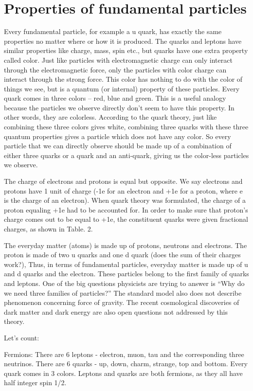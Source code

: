 \section{Properties of fundamental particles}
Every fundamental particle, for example a u quark, has exactly the same properties no matter where or how it is produced.   The quarks and leptons have similar properties like charge, mass, spin etc., but quarks have one extra property called color. Just like particles with electromagnetic charge can only interact through the electromagnetic force, only the particles with color charge can interact through the strong force. This color has nothing to do with the color of things we see, but is a quantum (or internal) property of these particles. Every quark comes in three colors – red, blue and green. This is a useful analogy because the particles we observe directly don’t seem to have this property. In other words, they are colorless. According to the quark theory, just like combining these three colors gives white, combining three quarks with these three quantum properties gives a particle which does not have any color. So every particle that we can directly observe should be made up of a combination of either three quarks or a quark and an anti-quark, giving us the color-less particles we observe. 

The charge of electrons and protons is equal but opposite. We say electrons and protons have 1 unit of charge (-1e for an electron and +1e for a proton, where e is the charge of an electron). When quark theory was formulated, the charge of a proton equaling +1e had to be accounted for. In order to make sure that proton’s charge comes out to be equal to +1e, the constituent quarks were given fractional charges, as shown in Table. 2.

The everyday matter (atoms) is made up of protons, neutrons and electrons. The proton is made of two u quarks and one d quark (does the sum of their charges work?), Thus, in terms of fundamental particles,  everyday matter is made up of u and d quarks and the electron.  These particles belong to the first family of quarks and leptons. One of the big questions physicists are trying to answer is “Why do we need three families of particles?” The standard model also does not describe phenomenon concerning force of gravity. The recent cosmological discoveries of dark matter and dark energy are also open questions not addressed by this theory. 

Let’s count: 

Fermions: There are 6 leptons - electron, muon, tau and the corresponding three neutrinos.
There are 6 quarks - up, down, charm, strange, top and bottom. Every quark comes in 3 colors.
Leptons and quarks are both fermions, as they all have half integer spin 1/2.

